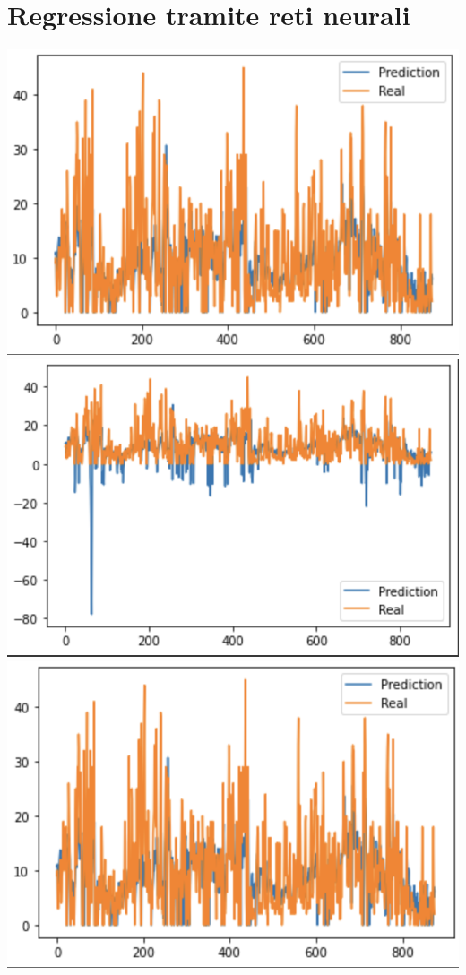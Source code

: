 \documentclass{article}
\begin{document}
\section{Regressione tramite reti neurali}
\includegraphics[scale = 0.5]{Immagini/Regressione1.PNG}
\\\includegraphics[scale = 0.5]{Immagini/Regressione2.PNG}
\\\includegraphics[scale = 0.5]{Immagini/Regressione3.PNG}
\end{document}
